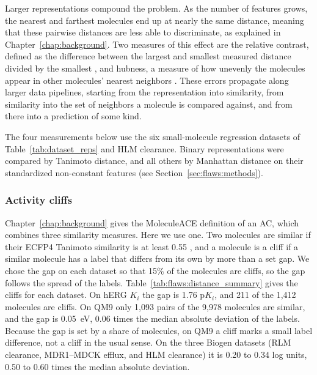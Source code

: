 Larger representations compound the problem. As the number of features grows, the nearest and farthest molecules end up at nearly the same distance, meaning that these pairwise distances are less able to discriminate, as explained in Chapter~\ref{chap:background}. Two measures of this effect are the relative contrast, defined as the difference between the largest and smallest measured distance divided by the smallest \citep{Aggarwal2001}, and hubness, a measure of how unevenly the molecules appear in other molecules' nearest neighbors \citep{Radovanovic2010}. These errors propagate along larger data pipelines, starting from the representation into similarity, from similarity into the set of neighbors a molecule is compared against, and from there into a prediction of some kind. 

The four measurements below use the six small-molecule regression datasets of Table~\ref{tab:dataset_reps} and HLM clearance. Binary representations were compared by Tanimoto distance, and all others by Manhattan distance on their standardized non-constant features (see Section~\ref{sec:flaws:methods}).

\subsubsection{Activity cliffs}
Chapter~\ref{chap:background} gives the MoleculeACE definition of an AC, which combines three similarity measures. Here we use one. Two molecules are similar if their ECFP4 Tanimoto similarity is at least 0.55 \citep{Hu2015}, and a molecule is a cliff if a similar molecule has a label that differs from its own by more than a set gap. We chose the gap on each dataset so that 15\% of the molecules are cliffs, so the gap follows the spread of the labels. Table~\ref{tab:flaws:distance_summary} gives the cliffs for each dataset. On hERG $K_i$ the gap is 1.76 p$K_i$, and 211 of the 1,412 molecules are cliffs. On QM9 only 1,093 pairs of the 9,978 molecules are similar, and the gap is 0.05~eV, 0.06 times the median absolute deviation of the labels. Because the gap is set by a share of molecules, on QM9 a cliff marks a small label difference, not a cliff in the usual sense. On the three Biogen datasets (RLM clearance, MDR1--MDCK efflux, and HLM clearance) it is 0.20 to 0.34 log units, 0.50 to 0.60 times the median absolute deviation.

